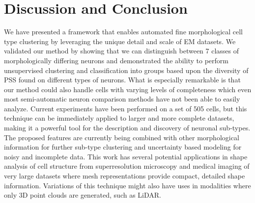 \documentclass[runningheads]{llncs}
\begin{document}
\section{Discussion and Conclusion}
\label{sec:typestyle}
We have presented a framework that enables automated fine morphological cell type clustering by leveraging the unique detail and scale of EM datasets. We validated our method by showing that we can distinguish between 7 classes of morphologically differing neurons and demonstrated the ability to perform unsupervised clustering and classification into groups based upon the diversity of PSS found on different types of neurons. What is especially remarkable is that our method could also handle cells with varying levels of completeness which even most semi-automatic neuron comparison methods have not been able to easily analyze. Current experiments have been performed on a set of 505 cells, but this technique can be immediately applied to larger and more complete datasets, making it a powerful tool for the description and discovery of neuronal sub-types.
The proposed features are currently being combined with other morphological information for further sub-type clustering and uncertainty based modeling for noisy and incomplete data.
This work has several potential applications in shape analysis of cell structure from superresolution microscopy and medical imaging of very large datasets where mesh representations provide compact, detailed shape information. Variations of this technique might also have uses in modalities where only 3D point clouds are generated, such as LiDAR.


\end{document}

